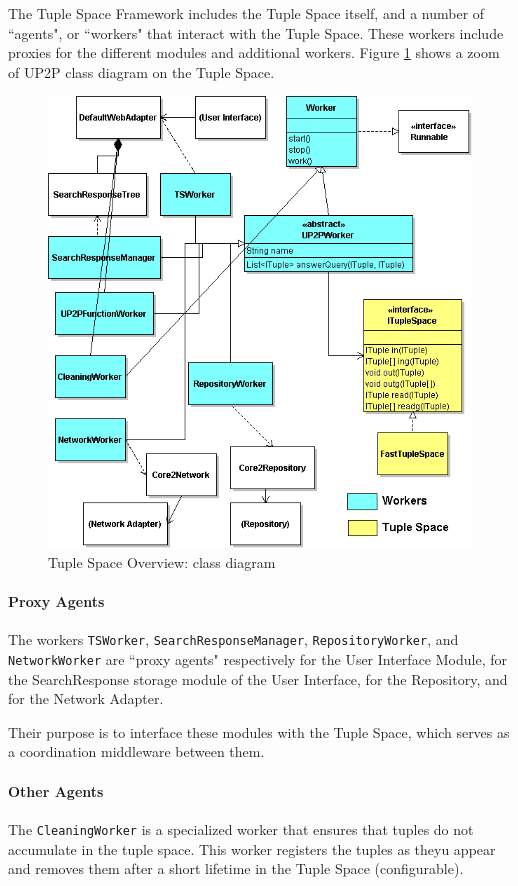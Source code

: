 \documentclass[titlepage]{article}%
\begin{document}
The Tuple Space Framework includes the Tuple Space itself, and a number of ``agents", or ``workers" that interact with the Tuple Space. These workers include proxies for the different modules and additional workers.
Figure \ref{fig:TSClass} shows a zoom of UP2P class diagram on the Tuple Space.
\begin{figure}[htb]
\centering
	\includegraphics[scale=0.5]{diagrams/UP2PTupleSpaceModuleClassesColor.png}
	\caption{Tuple Space Overview: class diagram}
	\label{fig:TSClass}
\end{figure}

\paragraph{Proxy Agents}
The workers \verb.TSWorker., \verb.SearchResponseManager., \verb.RepositoryWorker., and \verb.NetworkWorker. are ``proxy agents" respectively for the User Interface Module, for the SearchResponse storage module of the User Interface, for the Repository, and for the Network Adapter.

Their purpose is to interface these modules with the Tuple Space, which serves as a coordination middleware between them.

\paragraph{Other Agents}
The \verb.CleaningWorker. is a specialized worker that ensures that tuples do not accumulate in the tuple space. This worker registers the tuples as theyu appear and removes them after a short lifetime in the Tuple Space (configurable).
\end{document}
